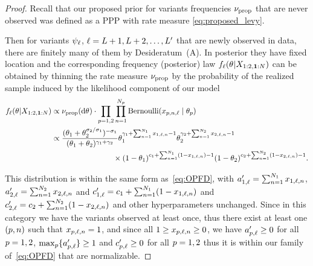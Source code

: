 \begin{proof}
    Recall that our proposed prior for variants frequencies $\nu_{\mathrm{prop}}$ that are never observed was defined as a PPP with rate measure \cref{eq:proposed_levy}.

    Then for variants $\psi_{\ell}$, $\ell=L+1,L+2,\ldots,L'$ that are newly observed in data, there are finitely many of them by Desideratum~(A). In posterior they have fixed location and the corresponding frequency (posterior) law $f_{\variantidx}(\vecvariantfreq{}| \pilotdata)$ can be obtained by thinning the rate measure $\nu_{\mathrm{prop}}$  by the probability of the realized sample induced by the likelihood component of our model
    \begin{align*}
        f_{\variantidx}(\vecvariantfreq{}| \pilotdata)&\propto\ratemeasproposed(\de\vecvariantfreq{})\cdot \prod_{\popidx=1,2} \prod_{\unitidx=1}^{\samplesize{\popidx}} \BER(x_{\popidx, \unitidx, \variantidx} \mid \variantfreqperpop{\popidx})\\
        &\propto \frac{(\variantfreqperpop{1}+\variantfreqperpop{2}^{\rate{2}/\rate{1}})^{-\rate{1}}}{(\variantfreqperpop{1}+\variantfreqperpop{2})^{\corr{1}+\corr{2}}}\variantfreqperpop{1}^{\corr{1}+\sum_{\unitidx=1}^{\samplesize{1}} x_{1,\variantidx, \unitidx}-1}\variantfreqperpop{2}^{\corr{2} +\sum_{\unitidx=1}^{\samplesize{2}} x_{2,\variantidx, \unitidx} -1}\\
        &  \qquad \qquad \qquad \qquad  \times(1-\variantfreqperpop{1})^{\conc{1}+\sum_{\unitidx=1}^{\samplesize{1}} (1-x_{1,\variantidx, \unitidx})-1}(1-\variantfreqperpop{2})^{\conc{2}+\sum_{\unitidx=1}^{\samplesize{2}} (1-x_{2,\variantidx, \unitidx})-1}.
    \end{align*}

    This distribution is within the same form as~\cref{eq:OPFD}, with $a_{1,\ell}'=\sum_{n=1}^{N_{1}} x_{1,\ell, n}$, $a_{2,\ell}'=\sum_{n=1}^{N_{2}} x_{2,\ell, n}$ and $c_{1,\ell}'=c_{1}+\sum_{n=1}^{N_{1}} (1-x_{1,\ell, n})$ and $c_{2,\ell}'=c_{2}+\sum_{n=1}^{N_{2}} (1-x_{2,\ell, n})$ and other hyperparameters unchanged. Since in this category we have the variants observed at least once, thus there exist at least one $(p,n)$ such that $x_{p,\ell, n}=1$, and since all $1\ge x_{p,\ell, n}\ge 0$, we have $a_{p,\ell}'\ge 0$ for all $p=1,2$, $\max_p\{a_{p,\ell}'\}\ge 1$ and $ c_{p,\ell}'\ge 0$ for all $p=1,2$ thus it is within our family of~\cref{eq:OPFD} that are normalizable.
    

\end{proof}

